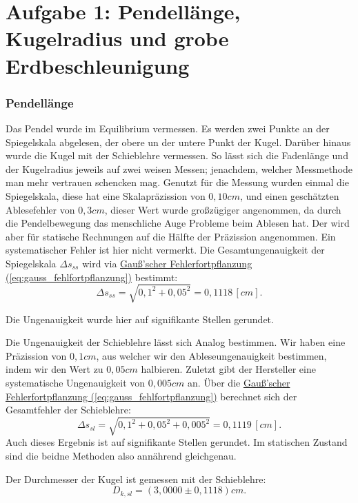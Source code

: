 \twocolumn

\section{Aufgabe 1: Pendellänge, Kugelradius und grobe Erdbeschleunigung}
\subsubsection*{Pendellänge}
Das Pendel wurde im Equilibrium vermessen. Es werden zwei Punkte an der Spiegelskala abgelesen, der obere un der untere Punkt der Kugel. Darüber hinaus wurde die Kugel mit der Schieblehre vermessen. So lässt sich die Fadenlänge und der Kugelradius jeweils auf zwei weisen Messen; jenachdem, welcher Messmethode man mehr vertrauen schencken mag.
Genutzt für die Messung wurden einmal die Spiegelskala, diese hat eine Skalapräzission von $0,10cm$, und einen geschätzten Ablesefehler von $0,3cm$, dieser Wert wurde großzügiger angenommen, da durch die Pendelbewegung das menschliche Auge Probleme beim Ablesen hat. Der wird aber für statische Rechnungen auf die Hälfte der Präzission angenommen. Ein systematischer Fehler ist hier nicht vermerkt. Die Gesamtungenauigkeit der Spiegelskala $\Delta s_{ss}$ wird via \hyperref[eq:gauss_fehlfortpflanzung]{Gauß'scher Fehlerfortpflanzung (\ref*{eq:gauss_fehlfortpflanzung})} bestimmt:
\begin{equation}
    \Delta s_{ss} = \sqrt{0,1^2+0,05^2} = 0,1118 \,[cm].
\end{equation}

Die Ungenauigkeit wurde hier auf signifikante Stellen gerundet.

Die Ungenauigkeit der Schieblehre lässt sich Analog bestimmen. Wir haben eine Präzission von $0,1cm$, aus welcher wir den Ableseungenauigkeit bestimmen, indem wir den Wert zu $0,05cm$ halbieren. Zuletzt gibt der Hersteller eine systematische Ungenauigkeit von $0,005cm$ an. Über die \hyperref[eq:gauss_fehlfortpflanzung]{Gauß'scher Fehlerfortpflanzung (\ref*{eq:gauss_fehlfortpflanzung})} berechnet sich der Gesamtfehler der Schieblehre:
\begin{equation}
    \Delta s_{sl} = \sqrt{0,1^2+0,05^2+0,005^2} = 0,1119 \, [cm].
\end{equation}
Auch dieses Ergebnis ist auf signifikante Stellen gerundet. Im statischen Zustand sind die beidne Methoden also annährend gleichgenau.

Der Durchmesser der Kugel ist gemessen mit der Schieblehre:
\begin{equation}
    \boxed{
        D_{k,sl} = (3,0000 \pm 0,1118)cm.
    }
\end{equation}

